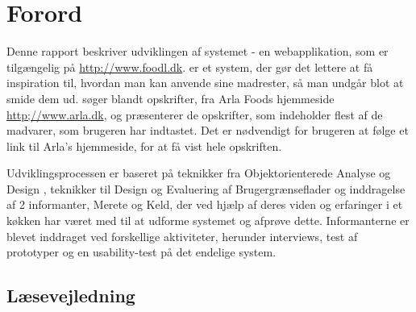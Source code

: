\chapter*{Forord}
Denne rapport beskriver udviklingen af systemet \Foodl{} - en webapplikation, som er tilgængelig på \url{http://www.foodl.dk}. \Foodl{} er et system, der gør det lettere at få inspiration til, hvordan man kan anvende sine madrester, så man undgår blot at smide dem ud. \Foodl{} søger blandt opskrifter, fra Arla Foods hjemmeside \url{http;//www.arla.dk}, og præsenterer de opskrifter, som indeholder flest af de madvarer, som brugeren har indtastet. Det er nødvendigt for brugeren at følge et link til Arla's hjemmeside, for at få vist hele opskriften.

Udviklingsprocessen er baseret på teknikker fra Objektorienterede Analyse og Design \cite{ooad}, teknikker til Design og Evaluering af Brugergrænseflader \cite{deb} og inddragelse af 2 informanter, Merete og Keld, der ved hjælp af deres viden og erfaringer i et køkken har været med til at udforme systemet og afprøve dette. Informanterne er blevet inddraget ved forskellige aktiviteter, herunder interviews, test af prototyper og en usability-test på det endelige system.

\section*{Læsevejledning}
